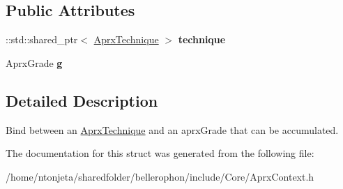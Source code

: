 \subsection*{Public Attributes}
\begin{DoxyCompactItemize}
\item 
\hypertarget{structbellerophon_1_1core_1_1AprxLocation_a70cbb151211e4bd36858030342234730}{}\label{structbellerophon_1_1core_1_1AprxLocation_a70cbb151211e4bd36858030342234730} 
\+::std\+::shared\+\_\+ptr$<$ \hyperlink{classbellerophon_1_1core_1_1AprxTechnique}{Aprx\+Technique} $>$ {\bfseries technique}
\item 
\hypertarget{structbellerophon_1_1core_1_1AprxLocation_a5916f0b3c29810d005a8a24e5c547ae5}{}\label{structbellerophon_1_1core_1_1AprxLocation_a5916f0b3c29810d005a8a24e5c547ae5} 
Aprx\+Grade {\bfseries g}
\end{DoxyCompactItemize}


\subsection{Detailed Description}
Bind between an \hyperlink{classbellerophon_1_1core_1_1AprxTechnique}{Aprx\+Technique} and an aprx\+Grade that can be \textquotesingle{}accumulated\textquotesingle{}. 

The documentation for this struct was generated from the following file\+:\begin{DoxyCompactItemize}
\item 
/home/ntonjeta/sharedfolder/bellerophon/include/\+Core/Aprx\+Context.\+h\end{DoxyCompactItemize}
